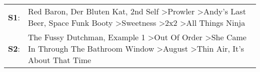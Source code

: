 \begin{supertabular}{p{0.03\textwidth}p{0.92\textwidth}}
 \textbf{S1}:  &  Red Baron\textsuperscript{}, \enspace Der Bluten Kat\textsuperscript{}, \enspace 2nd Self\textsuperscript{} \textgreater \enspace Prowler\textsuperscript{} \textgreater \enspace Andy's Last Beer\textsuperscript{}, \enspace Space Funk Booty\textsuperscript{} \textgreater \enspace Sweetness\textsuperscript{} \textgreater \enspace 2x2\textsuperscript{} \textgreater \enspace All Things Ninja\textsuperscript{}  \enspace  \\
 \textbf{S2}:  &                                                          The Fussy Dutchman\textsuperscript{}, \enspace Example 1\textsuperscript{} \textgreater \enspace Out Of Order\textsuperscript{} \textgreater \enspace She Came In Through The Bathroom Window\textsuperscript{} \textgreater \enspace August\textsuperscript{} \textgreater \enspace Thin Air\textsuperscript{}, \enspace It's About That Time\textsuperscript{}  \enspace  \\
\end{supertabular}
